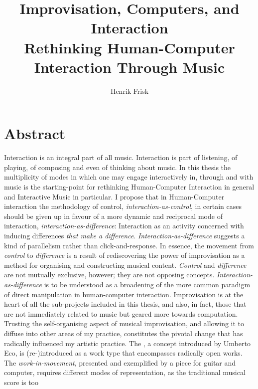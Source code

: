 \documentclass[a4paper]{book}
\title{\usefont{T1}{phv}{m}{n}Improvisation, Computers, and Interaction\\{\small Rethinking Human-Computer Interaction Through Music}}
\author{Henrik Frisk}
\date{}
\numberwithin{equation}{section}
\begin{document}
\chapter*{Abstract}
\label{cha:abstract}
\setcounter{page}{1}
\pagestyle{plain}

Interaction is an integral part of all music. Interaction is part of listening, of playing,
of composing and even of thinking about music. In this thesis the multiplicity of modes in
which one may engage interactively in, through and with music is the starting-point for
rethinking Human-Computer Interaction in general
and Interactive Music in particular. I propose that in
Human-Computer interaction the methodology of
control, \emph{interaction-as-control}, in certain cases should
be given up in favour of a more dynamic and reciprocal mode of interaction,
\emph{interaction-as-difference}: Interaction as an
activity concerned with inducing differences \emph{that make a difference}.
\emph{Interaction-as-difference} suggests a kind of
parallelism rather than click-and-response. In essence, the movement from \emph{control} to
\emph{difference} is a result of rediscovering the power of improvisation as a method for
organising and constructing musical content. \emph{Control} and \emph{difference} are not
mutually exclusive, however; they are not opposing concepts. \emph{Interaction-as-difference}
is to be understood as a broadening of the more common paradigm of direct manipulation in
human-computer interaction. Improvisation is at
the heart of all the sub-projects included in this thesis, and also, in fact, those that are
not immediately related to music but geared more towards computation. Trusting the
self-organising aspect of musical improvisation, and allowing it to diffuse into other areas
of my practice, constitutes the pivotal change that has radically influenced my artistic
practice. The , a concept
introduced by Umberto Eco, is (re-)introduced as a work type that encompasses radically open
works. The \emph{work-in-movement}, presented and exemplified by a piece for guitar and
computer, requires different modes of representation, as the traditional musical score is too
\end{document}
